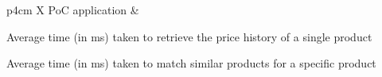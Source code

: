 \begin{table}[h]
\begin{tabularx}{\textwidth}{p{4cm} X}
        \midrule
        PoC application & \begin{minipage}[t]{\linewidth}\raggedright \textbullet{} Average time (in ms) taken to retrieve the price history of a single product\par \textbullet{} Average time (in ms) taken to match similar products for a specific product\end{minipage} \\
        \bottomrule
    \end{tabularx}
    \caption{Evaluation metrics used for each phase}
    \label{tab:evaluation_metrics}
\end{table}